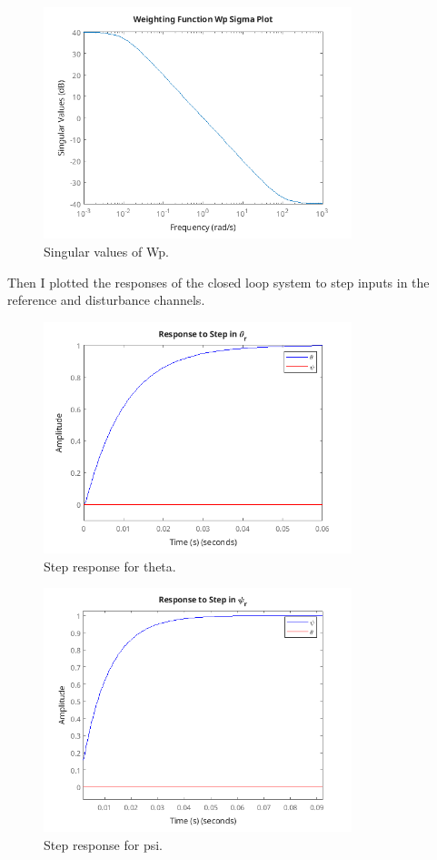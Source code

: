 \documentclass{article}
\begin{document}
\begin{figure}
    \centering
    \includegraphics[width=0.8\textwidth]{sigmaWp.png}
    \caption{Singular values of Wp.}
    \label{fig:sigmaWp}
\end{figure}

Then I plotted the responses of the closed loop system to step inputs in the reference and disturbance channels.

\begin{figure}
    \centering
    \includegraphics[width=0.8\textwidth]{stepTheta.png}
    \caption{Step response for theta.}
    \label{fig:stepTheta}
\end{figure}

\begin{figure}
    \centering
    \includegraphics[width=0.8\textwidth]{stepPsi.png}
    \caption{Step response for psi.}
    \label{fig:stepPsi}
\end{figure}
\end{document}
